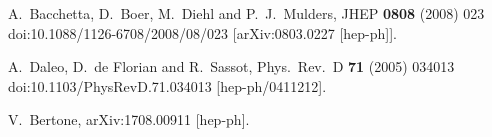\documentclass[10pt,a4paper]{article}
\begin{document}
\begin{thebibliography}{alp}
  A.~Bacchetta, D.~Boer, M.~Diehl and P.~J.~Mulders,
  JHEP {\bf 0808} (2008) 023
  doi:10.1088/1126-6708/2008/08/023
  [arXiv:0803.0227 [hep-ph]].

  A.~Daleo, D.~de Florian and R.~Sassot,
  Phys.\ Rev.\ D {\bf 71} (2005) 034013
  doi:10.1103/PhysRevD.71.034013
  [hep-ph/0411212].

  V.~Bertone,
  arXiv:1708.00911 [hep-ph].

\end{thebibliography}
\end{document}
